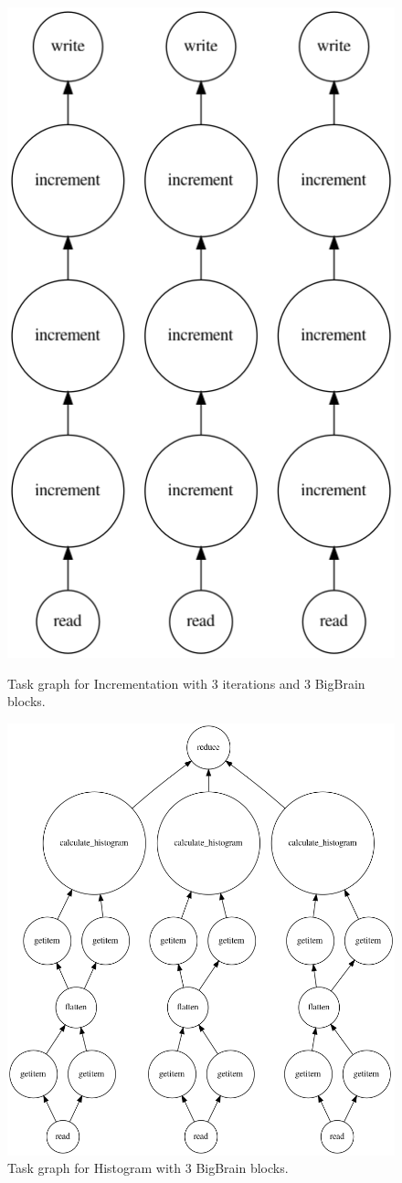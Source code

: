 \documentclass[AMA,STIX1COL]{WileyNJD-v2}
\begin{document}
\begin{figure}[h]
	\centering
	\begin{minipage}{.45\textwidth}
		\centering
		\includegraphics[width=0.45\linewidth]{figures/increment.png}
		\caption{Task graph for Incrementation with 3 iterations and 3 BigBrain blocks.}
		\label{fig:graph-increment}		
	\end{minipage}
	\begin{minipage}{.45\textwidth}
		\centering
		\includegraphics[width=0.45\linewidth]{figures/histogram.png}
		\caption{Task graph for Histogram with 3 BigBrain blocks.}
		\label{fig:graph-histogram}			
	\end{minipage}
\end{figure}
							
\end{document}

